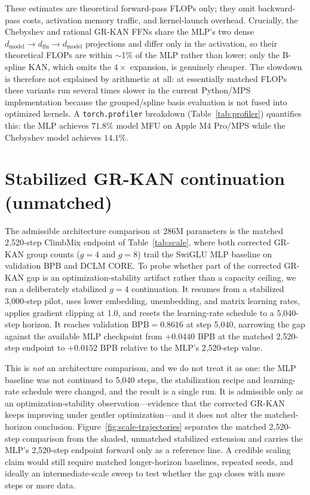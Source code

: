 \documentclass{article}
\newcommand{\modelname}[1]{\textsc{#1}}
\newcommand{\bpb}{\mathrm{BPB}}
\newcommand{\grkan}{\modelname{GR-KAN}}
\begin{document}
These estimates are theoretical forward-pass FLOPs only; they omit backward-pass costs, activation memory traffic, and kernel-launch overhead. Crucially, the Chebyshev and rational \grkan{} FFNs share the MLP's two dense \(d_{\mathrm{model}}\!\to\!d_{\mathrm{ffn}}\!\to\!d_{\mathrm{model}}\) projections and differ only in the activation, so their theoretical FLOPs are within \(\sim\)1\% of the MLP rather than lower; only the B-spline KAN, which omits the \(4\times\) expansion, is genuinely cheaper. The slowdown is therefore not explained by arithmetic at all: at essentially matched FLOPs these variants run several times slower in the current Python/MPS implementation because the grouped/spline basis evaluation is not fused into optimized kernels. A \texttt{torch.profiler} breakdown (Table~\ref{tab:profiler}) quantifies this: the MLP achieves \(71.8\%\) model MFU on Apple M4 Pro/MPS while the Chebyshev model achieves \(14.1\%\).

\section{Stabilized GR-KAN continuation (unmatched)}
\label{app:continuation}

The admissible architecture comparison at 286M parameters is the matched 2,520-step ClimbMix endpoint of Table~\ref{tab:scale}, where both corrected \grkan{} group counts (\(g=4\) and \(g=8\)) trail the SwiGLU MLP baseline on validation BPB and DCLM CORE. To probe whether part of the corrected \grkan{} gap is an optimization-stability artifact rather than a capacity ceiling, we ran a deliberately stabilized \(g=4\) continuation. It resumes from a stabilized 3,000-step pilot, uses lower embedding, unembedding, and matrix learning rates, applies gradient clipping at 1.0, and resets the learning-rate schedule to a 5,040-step horizon. It reaches validation \(\bpb=0.8616\) at step 5,040, narrowing the gap against the available MLP checkpoint from \(+0.0440\) BPB at the matched 2,520-step endpoint to \(+0.0152\) BPB relative to the MLP's 2,520-step value.

This is \emph{not} an architecture comparison, and we do not treat it as one: the MLP baseline was not continued to 5,040 steps, the stabilization recipe and learning-rate schedule were changed, and the result is a single run. It is admissible only as an optimization-stability observation---evidence that the corrected \grkan{} keeps improving under gentler optimization---and it does not alter the matched-horizon conclusion. Figure~\ref{fig:scale-trajectories} separates the matched 2,520-step comparison from the shaded, unmatched stabilized extension and carries the MLP's 2,520-step endpoint forward only as a reference line. A credible scaling claim would still require matched longer-horizon baselines, repeated seeds, and ideally an intermediate-scale sweep to test whether the gap closes with more steps or more data.
\end{document}
